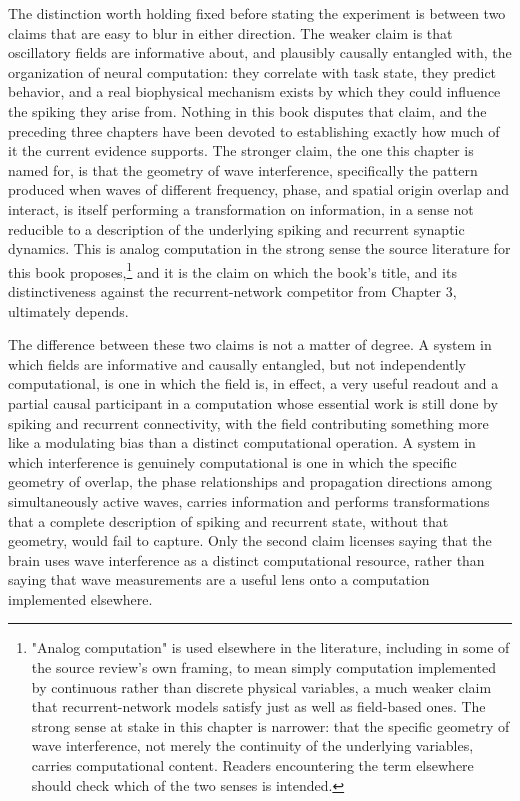 \documentclass[11pt]{book}
\begin{document}
The distinction worth holding fixed before stating the experiment is between two claims that are easy to blur in either direction. The weaker claim is that oscillatory fields are informative about, and plausibly causally entangled with, the organization of neural computation: they correlate with task state, they predict behavior, and a real biophysical mechanism exists by which they could influence the spiking they arise from. Nothing in this book disputes that claim, and the preceding three chapters have been devoted to establishing exactly how much of it the current evidence supports. The stronger claim, the one this chapter is named for, is that the geometry of wave interference, specifically the pattern produced when waves of different frequency, phase, and spatial origin overlap and interact, is itself performing a transformation on information, in a sense not reducible to a description of the underlying spiking and recurrent synaptic dynamics. This is analog computation in the strong sense the source literature for this book proposes,\footnote{"Analog computation" is used elsewhere in the literature, including in some of the source review's own framing, to mean simply computation implemented by continuous rather than discrete physical variables, a much weaker claim that recurrent-network models satisfy just as well as field-based ones. The strong sense at stake in this chapter is narrower: that the specific geometry of wave interference, not merely the continuity of the underlying variables, carries computational content. Readers encountering the term elsewhere should check which of the two senses is intended.} and it is the claim on which the book's title, and its distinctiveness against the recurrent-network competitor from Chapter 3, ultimately depends.

The difference between these two claims is not a matter of degree. A system in which fields are informative and causally entangled, but not independently computational, is one in which the field is, in effect, a very useful readout and a partial causal participant in a computation whose essential work is still done by spiking and recurrent connectivity, with the field contributing something more like a modulating bias than a distinct computational operation. A system in which interference is genuinely computational is one in which the specific geometry of overlap, the phase relationships and propagation directions among simultaneously active waves, carries information and performs transformations that a complete description of spiking and recurrent state, without that geometry, would fail to capture. Only the second claim licenses saying that the brain uses wave interference as a distinct computational resource, rather than saying that wave measurements are a useful lens onto a computation implemented elsewhere.
\end{document}
